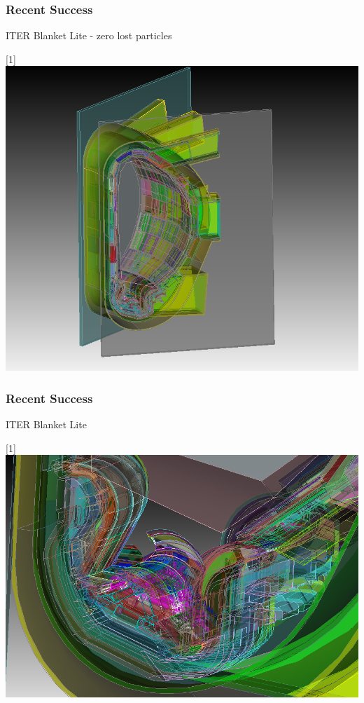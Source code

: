\documentclass[14pt]{beamer}
\begin{document}
\begin{frame}
\frametitle{Recent Success}

ITER Blanket Lite
\pause
 - zero lost particles
\begin{center}
\scalebox{-1}[1]{\includegraphics[scale=0.3]{blanketlitemodel.png}}
\end{center}

\end{frame}

\begin{frame}
\frametitle{Recent Success}

ITER Blanket Lite
\begin{center}
\scalebox{-1}[1]{\includegraphics[scale=0.3]{blanketlitemodel_detail.png}}
\end{center}

\end{frame}
\end{document}
